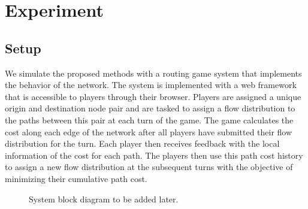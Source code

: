 \documentclass{sig-alternate-ipsn13}
\begin{document}
\section{Experiment}
\label{sec:experiment}

\subsection{Setup}

We simulate the proposed methods with a routing game system that implements the behavior of the network. The system is implemented with a web framework that is accessible to players through their browser. Players are assigned a unique origin and destination node pair and are tasked to assign a flow distribution to the paths between this pair at each turn of the game. The game calculates the cost along each edge of the network after all players have submitted their flow distribution for the turn. Each player then receives feedback with the local information of the cost for each path. The players then use this path cost history to assign a new flow distribution at the subsequent turns with the objective of minimizing their cumulative path cost.


\begin{figure}
  \centering
  \caption{System block diagram to be added later.}
  \label{fig:system_block_diagram}
\end{figure}


\end{document}
